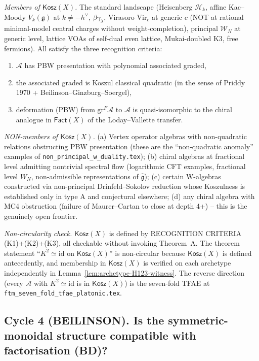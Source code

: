 \documentclass[11pt]{article}
\theoremstyle{definition}
\newcommand{\Kosz}{\mathsf{Kosz}}
\newcommand{\Fact}{\mathsf{Fact}}
\newcommand{\id}{\mathrm{id}}
\newcommand{\cA}{\mathcal{A}}
\begin{document}
\emph{Members of $\Kosz(X)$.} The standard landscape (Heisenberg
$\mathcal{H}_k$, affine Kac--Moody $V_k(\mathfrak{g})$ at
$k\neq-h^\vee$, $\beta\gamma_\lambda$, Virasoro
$\mathrm{Vir}_c$ at generic $c$ (NOT at rational minimal-model
central charges without weight-completion), principal $\mathcal{W}_N$
at generic level, lattice VOAs of self-dual even lattice, Mukai-doubled
K3, free fermions). All satisfy the three recognition criteria:
\begin{enumerate}[label=\textup{(K\arabic*)}]
\item $\cA$ has PBW presentation with polynomial associated graded,
\item the associated graded is Koszul classical quadratic (in the
  sense of Priddy 1970 + Beilinson--Ginzburg--Soergel),
\item deformation (PBW) from $\mathrm{gr}^F\cA$ to $\cA$ is
  quasi-isomorphic to the chiral analogue in $\Fact(X)$ of the
  Loday--Vallette transfer.
\end{enumerate}

\emph{NON-members of $\Kosz(X)$.} (a) Vertex operator algebras with
non-quadratic relations obstructing PBW presentation (these are
the ``non-quadratic anomaly'' examples of
\texttt{non\_principal\_w\_duality.tex}); (b) chiral algebras at
fractional level admitting nontrivial spectral flow
(logarithmic CFT examples, fractional level $W_N$, non-admissible
representations of $\widehat{\mathfrak{g}}$); (c) certain W-algebras
constructed via non-principal Drinfeld--Sokolov reduction whose
Koszulness is established only in type A and conjectural elsewhere;
(d) any chiral algebra with MC4 obstruction (failure of
Maurer--Cartan to close at depth 4+) -- this is the genuinely
open frontier.

\emph{Non-circularity check.} $\Kosz(X)$ is defined by RECOGNITION
CRITERIA (K1)+(K2)+(K3), all checkable without invoking
Theorem~A. The theorem statement ``$K^{2}\simeq\id$ on $\Kosz(X)$''
is non-circular because $\Kosz(X)$ is defined antecedently, and
membership in $\Kosz(X)$ is verified on each archetype independently
in Lemma~\ref{lem:archetype-H123-witness}. The reverse direction
(every $\cA$ with $K^{2}\simeq\id$ is in $\Kosz(X)$) is the
seven-fold TFAE at \texttt{ftm\_seven\_fold\_tfae\_platonic.tex}.

\subsection*{Cycle 4 (BEILINSON). Is the symmetric-monoidal structure
compatible with factorisation (BD)?}
\end{document}
